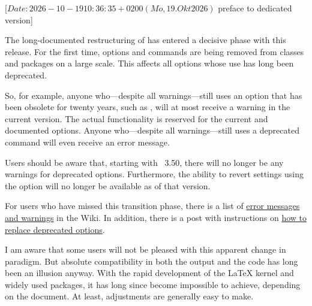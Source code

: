 %
%
%
%
%

                 [$Date: 2026-10-19 10:36:35 +0200 (Mo, 19. Okt 2026) $
                  preface to dedicated version]


The long-documented restructuring of \KOMAScript{} has entered a decisive
phase with this release. For the first time, options and commands are being
removed from classes and packages on a large scale. This affects all options
whose use has long been deprecated.

So, for example, anyone who—despite all warnings—still uses an option that has
been obsolete for twenty years, such as , will at most
receive a warning in the current version. The actual functionality is reserved
for the current and documented options.  Anyone who—despite all warnings—still
uses a deprecated command will even receive an error message.

Users should be aware that, starting with \KOMAScript~3.50, there will no
longer be any warnings for deprecated options. Furthermore, the ability to
revert settings using the  option will no longer be available
as of that version.

For users who have missed this transition phase, there is a list of
\href{https://sourceforge.net/p/koma-script/wiki-en/Messages/}{error messages
  and warnings} in the Wiki. In addition, there is a post with instructions on
\href{https://sourceforge.net/p/koma-script/wiki-en/HowTo_DeprecatedOptions/}{how
  to replace deprecated options}.

I am aware that some users will not be pleased with this apparent change in
paradigm. But absolute compatibility in both the output and the code has long
been an illusion anyway. With the rapid development of the \LaTeX{} kernel and
widely used packages, it has long since become impossible to achieve,
depending on the document. At least, adjustments are generally easy to make.

